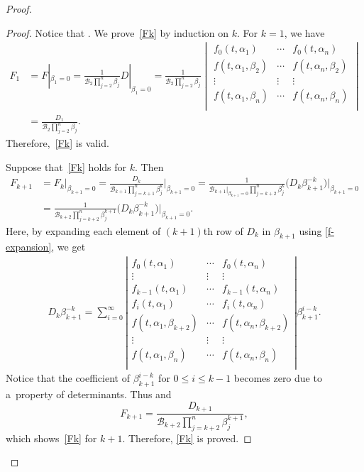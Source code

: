 \documentclass[pdftex]{sigma}
\numberwithin{equation}{section}
\theoremstyle{definition}
\begin{document}
\begin{proof}
\begin{proof}
Notice that
.
We prove~\eqref{Fk} by induction on $k$.
For $k=1$, we have
\begin{align*}
F_1
&=
F|_{\beta_1=0}
=
\frac{1}{{\mathcal B}_{2}\prod_{j=2}^n\beta_j}D|_{\beta_1=0}=
\frac{1}{{\mathcal B}_{2}\prod_{j=2}^n\beta_j}
\begin{vmatrix}
f_0(t,\alpha_1)&\cdots&f_0(t,\alpha_n)\\
f(t,\alpha_1,\beta_2)&\cdots&f(t,\alpha_n,\beta_2)\\
\vdots&\vdots&\vdots\\
f(t,\alpha_1,\beta_n)&\cdots&f(t,\alpha_n,\beta_n)\\
\end{vmatrix}
\\
&=
\frac{D_1}{{\mathcal B}_{2}\prod_{j=2}^n\beta_j}.
\end{align*}
Therefore,~\eqref{Fk} is valid.

{\samepage
Suppose that~\eqref{Fk} holds for $k$. Then
\begin{align*}
F_{k+1}
&=
F_k|_{\beta_{k+1}=0}
=
\frac{D_k}{{\mathcal B}_{k+1}\prod_{j=k+1}^n \beta_j^k}\Big|_{\beta_{k+1}=0}
=
\frac{1}{{\mathcal B}_{k+1}|_{\beta_{k+1}=0}\prod_{j=k+2}^n \beta_j^k}\bigl(D_k\beta_{k+1}^{-k}\bigr)\Big|_{\beta_{k+1}=0}
\\
&=
\frac{1}{{\mathcal B}_{k+2}\prod_{j=k+2}^n \beta_j^{k+1}}
\bigl(D_k\beta_{k+1}^{-k}\bigr)\Big|_{\beta_{k+1}=0}.
\end{align*}}
Here, by expanding each element of $(k+1)$th row of $D_k$ in $\beta_{k+1}$ using
\eqref{f-expansion}, we get
\begin{gather*}
D_k\beta_{k+1}^{-k}
=
\sum_{i=0}^\infty
\left|
\begin{matrix}
f_0(t,\alpha_1)&\cdots&f_0(t,\alpha_n)\\
\vdots&\vdots&\vdots\\
f_{k-1}(t,\alpha_1)&\cdots&f_{k-1}(t,\alpha_n)\\
f_{i}(t,\alpha_1)&\cdots&f_{i}(t,\alpha_n)\\
f(t,\alpha_1,\beta_{k+2})&\cdots&f(t,\alpha_n,\beta_{k+2})\\
\vdots&\vdots&\vdots\\
f(t,\alpha_1,\beta_{n})&\cdots&f(t,\alpha_n,\beta_{n})\\
\end{matrix}
\right|\beta_{k+1}^{i-k}.
\end{gather*}
Notice that the coefficient of $\beta_{k+1}^{i-k}$ for $0\leq i\leq k-1$ becomes zero
due to a~property of determinants.
Thus
and
\[
 F_{k+1}=
\frac{D_{k+1}}{{\mathcal B}_{k+2}\prod_{j=k+2}^n\beta_j^{k+1}},
\]
which shows~\eqref{Fk} for $k+1$. Therefore, \eqref{Fk} is proved.
\end{proof}


\end{proof}
\end{document}
